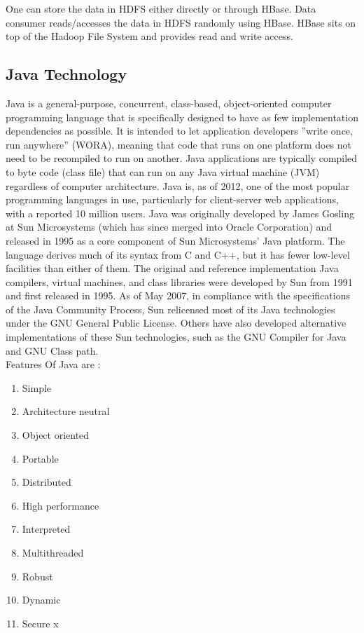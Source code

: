 \documentclass[oneside,a4paper,12pt]{report}
\begin{document}
{One can store the data in HDFS either directly or through HBase. Data consumer reads/accesses the data in HDFS randomly using HBase. HBase sits on top of the Hadoop File System and provides read and write access.
 
 \subsection{Java Technology}
 
 Java is a general-purpose, concurrent, class-based, object-oriented computer programming language that is specifically designed to have as few implementation dependencies as possible. It is intended to let application developers ”write once, run anywhere” (WORA), meaning that code that runs on one platform does not need to be recompiled to run on another. Java applications are typically compiled to byte code (class file) that can run on any Java virtual machine (JVM) regardless of computer architecture. Java is, as of 2012, one of the most popular programming languages in use, particularly for client-server web applications, with a reported 10 million users. Java was originally developed by James Gosling at Sun Microsystems (which has since merged into Oracle Corporation) and released in 1995 as a core component of Sun Microsystems’ Java platform. The language derives much of its syntax from C and C++, but it has fewer low-level facilities than either of them. The original and reference implementation Java compilers, virtual machines, and class libraries were developed by Sun from 1991 and first released in 1995. As of May 2007, in compliance with the specifications of the Java Community Process, Sun relicensed most of its Java technologies under the GNU General Public License. Others have also developed alternative implementations of these Sun technologies, such as the GNU Compiler for Java and GNU Class path.
 \\
 Features Of Java are :  	
 \begin{enumerate}
 	\item Simple
 	\item Architecture neutral
 	\item Object oriented
 	\item Portable
 	\item Distributed	
 	\item High performance
 	\item Interpreted	
 	\item Multithreaded
 	\item Robust
 	\item Dynamic
 	\item Secure	x
 \end{enumerate}
 
}
\end{document}
